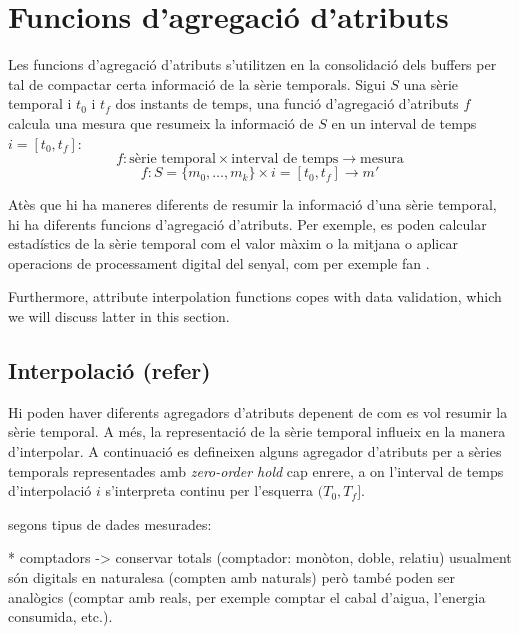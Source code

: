 \newcommand{\prev}{\ant}


\section{Funcions d'agregació d'atributs}
\label{sec:model:interpolador}
\label{sec:model:agregador}


Les funcions d'agregació d'atributs s'utilitzen en la consolidació
dels buffers per tal de compactar certa informació de la sèrie
temporals. Sigui $S$ una sèrie temporal i $t_0$ i $t_f$ dos instants
de temps, una funció d'agregació d'atributs $f$ calcula una mesura que
resumeix la informació de $S$ en un interval de temps $i=[t_0,t_f]$:
\[
f: \text{sèrie temporal} \times \text{interval de temps}
\longrightarrow \text{mesura}
\]
\[
f: S=\{m_0,\ldots,m_k\} \times i=[t_0,t_f] \longrightarrow  m'
\]


Atès que hi ha maneres diferents de resumir la informació d'una sèrie
temporal, hi ha diferents funcions d'agregació d'atributs. Per
exemple, es poden calcular estadístics de la sèrie temporal com el
valor màxim o la mitjana o aplicar operacions de processament digital
del senyal, com per exemple fan \textcite{zhang11}.



  Furthermore, attribute interpolation functions copes
with data validation, which we will discuss latter in this section.












\subsection{Interpolació (refer)}



Hi poden haver diferents agregadors d'atributs depenent de com es vol resumir la sèrie temporal. A més, la representació de la sèrie temporal influeix en la manera d'interpolar. A continuació es defineixen alguns agregador d'atributs per a sèries temporals representades amb  \emph{zero-order hold} cap enrere, a on l'interval de temps d'interpolació $i$ s'interpreta continu per l'esquerra $(T_0,T_f]$. 


segons tipus de dades mesurades:

* comptadors -> conservar totals (comptador: monòton, doble, relatiu)
usualment són digitals en naturalesa (compten amb naturals) però també poden ser analògics (comptar amb reals, per exemple comptar el cabal d'aigua, l'energia consumida, etc.).


